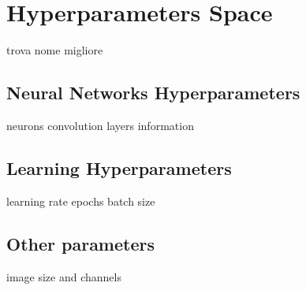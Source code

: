 \newpage
\section{Hyperparameters Space}

trova nome migliore



\subsection{Neural Networks Hyperparameters}

neurons
convolution layers information


\subsection{Learning Hyperparameters}

learning rate
epochs
batch size

\subsection{Other parameters}

image size and channels